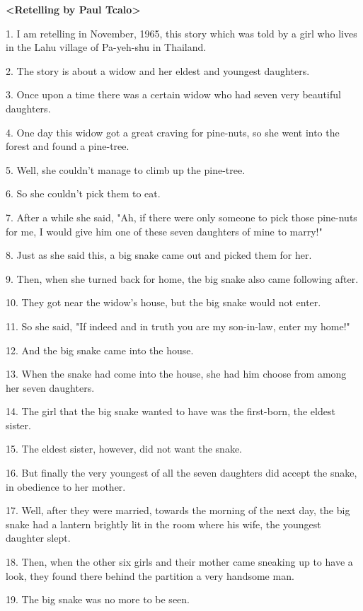 \setcounter{footnote}{0}

\textbf{<Retelling by Paul Tcalo>}

1. I am retelling in November, 1965, this story which was told by a girl who lives
in the Lahu village of Pa-yeh-shu in Thailand.

2. The story is about a widow and her eldest and youngest daughters.

3. Once upon a time there was a certain widow who had seven very beautiful daughters.

4. One day this widow got a great craving for pine-nuts, so she went into the forest
and found a pine-tree.

5. Well, she couldn't manage to climb up the pine-tree.

6. So she couldn't pick them to eat.

7. After a while she said, "Ah, if there were only someone to pick those
pine-nuts for me, I would give him one of these seven daughters of mine to marry!"

8. Just as she said this, a big snake came out and picked them for her.

9. Then, when she turned back for home, the big snake also came following after.

10. They got near the widow's house, but the big snake would not enter.

11. So she said, "If indeed and in truth you are my son-in-law, enter
my home!"

12. And the big snake came into the house.

13. When the snake had come into the house, she had him choose from among her seven
daughters.

14. The girl that the big snake wanted to have was the first-born, the eldest sister.

15. The eldest sister, however, did not want the snake.

16. But finally the very youngest of all the seven daughters did accept the snake,
in obedience to her mother.

17. Well, after they were married, towards the morning of the next day, the big
snake had a lantern brightly lit in the room where his wife, the youngest daughter
slept.

18. Then, when the other six girls and their mother came sneaking up to have a
look, they found there behind the partition a very handsome man.

19. The big snake was no more to be seen.


